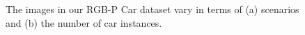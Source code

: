 \begin{figure}[t]
    \centering
    \hspace{4mm}
    \caption{The images in our RGB-P Car dataset vary in terms of (a) scenarios and (b) the number of car instances.}
    \label{fig:dataset}
\end{figure}

